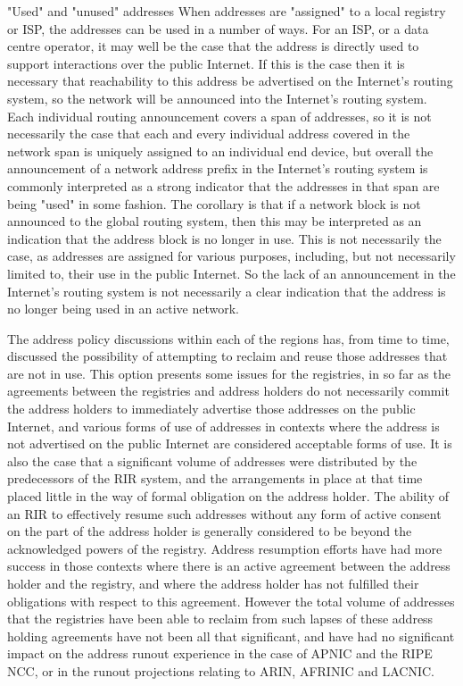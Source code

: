 \documentclass[11pt]{report}
\begin{document}
"Used" and "unused" addresses
When addresses are "assigned" to a local registry or ISP, the addresses can be used in a number
of ways. For an ISP, or a data centre operator, it may well be the case that the address is directly used to
support interactions over the public Internet. If this is the case then it is necessary that reachability to this
address be advertised on the Internet's routing system, so the network will be announced into the Internet's
routing system. Each individual routing announcement covers a span of addresses, so it is not necessarily
the case that each and every individual address covered in the network span is uniquely assigned to an
individual end device, but overall the announcement of a network address prefix in the Internet's routing
system is commonly interpreted as a strong indicator that the addresses in that span are being "used" in
some fashion.
The corollary is that if a network block is not announced to the global routing system, then this
may be interpreted as an indication that the address block is no longer in use. This is not necessarily the
case, as addresses are assigned for various purposes, including, but not necessarily limited to, their use in
the public Internet. So the lack of an announcement in the Internet's routing system is not necessarily a
clear indication that the address is no longer being used in an active network.

The address policy discussions within each of the regions has, from time to time, discussed the
possibility of attempting to reclaim and reuse those addresses that are not in use. This option presents some issues for the registries, in so far as the agreements between the registries and address holders do not necessarily commit the address holders to immediately advertise those addresses on the public Internet, and various forms of use of addresses in contexts where the address is not advertised on the public Internet are considered acceptable forms of use. It is also the case that a significant volume of addresses were distributed by the predecessors of the RIR system, and the arrangements in place at that time placed little in the way of formal obligation on the address holder. The ability of an RIR to effectively resume such addresses without any form of active consent on the part of the address holder is generally considered to be beyond the acknowledged powers of the registry. Address resumption efforts have had more success in
those contexts where there is an active agreement between the address holder and the registry, and where
the address holder has not fulfilled their obligations with respect to this agreement. However the total
volume of addresses that the registries have been able to reclaim from such lapses of these address holding
agreements have not been all that significant, and have had no significant impact on the address runout
experience in the case of APNIC and the RIPE NCC, or in the runout projections relating to ARIN,
AFRINIC and LACNIC.
\end{document}
